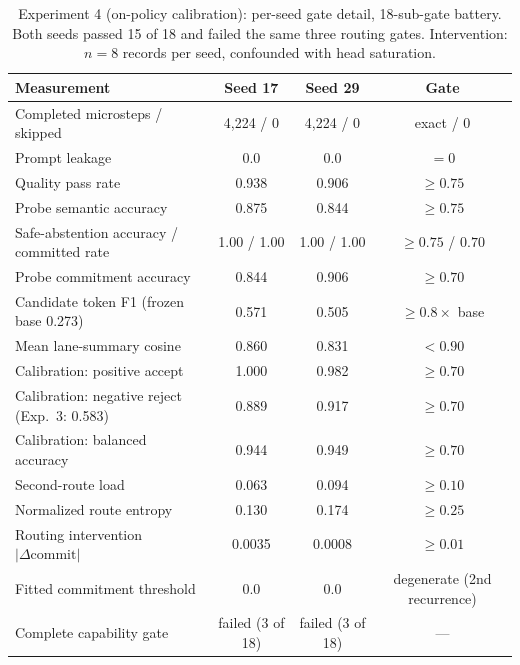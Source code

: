 \documentclass[10pt,a4paper]{article}
\newcommand{\fail}[1]{\textcolor{failred}{#1}}
\begin{document}
\begin{table}[htbp]
\caption{Experiment 4 (on-policy calibration): per-seed gate detail, 18-sub-gate battery. Both seeds passed 15 of 18 and failed the same three routing gates. Intervention: $n=8$ records per seed, confounded with head saturation.}
\label{tab:gates-exp4}
\centering\footnotesize
\begin{tabularx}{\textwidth}{@{}Xccc@{}}
\toprule
Measurement & Seed 17 & Seed 29 & Gate \\
\midrule
Completed microsteps / skipped & 4,224 / 0 & 4,224 / 0 & exact / 0 \\
Prompt leakage & 0.0 & 0.0 & $= 0$ \\
Quality pass rate & 0.938 & 0.906 & $\geq 0.75$ \\
Probe semantic accuracy & 0.875 & 0.844 & $\geq 0.75$ \\
Safe-abstention accuracy / committed rate & 1.00 / 1.00 & 1.00 / 1.00 & $\geq 0.75$ / $0.70$ \\
Probe commitment accuracy & 0.844 & 0.906 & $\geq 0.70$ \\
Candidate token F1 (frozen base 0.273) & 0.571 & 0.505 & $\geq 0.8\times$ base \\
Mean lane-summary cosine & 0.860 & 0.831 & $< 0.90$ \\
Calibration: positive accept & 1.000 & 0.982 & $\geq 0.70$ \\
Calibration: negative reject (Exp.\ 3: 0.583) & 0.889 & 0.917 & $\geq 0.70$ \\
Calibration: balanced accuracy & 0.944 & 0.949 & $\geq 0.70$ \\
Second-route load & \fail{0.063} & \fail{0.094} & $\geq 0.10$ \\
Normalized route entropy & \fail{0.130} & \fail{0.174} & $\geq 0.25$ \\
Routing intervention $|\Delta \text{commit}|$ & \fail{0.0035} & \fail{0.0008} & $\geq 0.01$ \\
Fitted commitment threshold & 0.0 & 0.0 & degenerate (2nd recurrence) \\
Complete capability gate & \fail{failed (3 of 18)} & \fail{failed (3 of 18)} & --- \\
\bottomrule
\end{tabularx}
\end{table}
\end{document}
